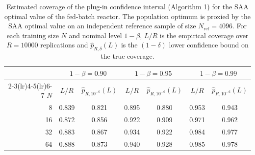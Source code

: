 \begin{table}[t]
  \centering
  \caption{Estimated coverage of the plug-in confidence interval (Algorithm 1) for the SAA optimal value of the fed-batch reactor. The population optimum is proxied by the SAA optimal value on an independent reference sample of size $N_{\mathrm{ref}} = 4096$. For each training size $N$ and nominal level $1-\beta$, $L/R$ is the empirical coverage over $R=10000$ replications and $\widehat p_{R,\delta}(L)$ is the $(1-\delta)$ lower confidence bound on the true coverage.}
  \label{tab:coverage_plugin}
  \begin{tabular}{rcccccc}
    \toprule
     & \multicolumn{2}{c}{$1-\beta = 0.90$} & \multicolumn{2}{c}{$1-\beta = 0.95$} & \multicolumn{2}{c}{$1-\beta = 0.99$} \\
    \cmidrule(lr){2-3}\cmidrule(lr){4-5}\cmidrule(lr){6-7}
    $N$ & $L/R$ & $\widehat{p}_{R,10^{-6}}(L)$ & $L/R$ & $\widehat{p}_{R,10^{-6}}(L)$ & $L/R$ & $\widehat{p}_{R,10^{-6}}(L)$ \\
    \midrule
    8 & 0.839 & 0.821 & 0.895 & 0.880 & 0.953 & 0.943 \\
    16 & 0.872 & 0.856 & 0.922 & 0.909 & 0.971 & 0.962 \\
    32 & 0.883 & 0.867 & 0.934 & 0.922 & 0.984 & 0.977 \\
    64 & 0.888 & 0.873 & 0.940 & 0.928 & 0.985 & 0.978 \\
    \bottomrule
  \end{tabular}
\end{table}
